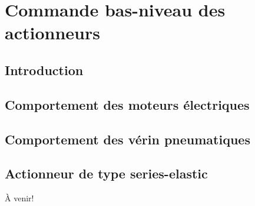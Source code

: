 \chapter{Commande bas-niveau des actionneurs}
\label{sec:actuatorcontrol}


\section{Introduction}


\section{Comportement des moteurs électriques}

\section{Comportement des vérin pneumatiques}

\section{Actionneur de type series-elastic}

À venir!